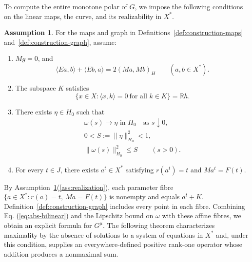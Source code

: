 \documentclass[11pt]{article}
\newcommand{\R}{\mathbb R}
\newcommand{\pair}[2]{\langle #1,#2\rangle}
\theoremstyle{definition}
\newtheorem{assumption}{Assumption}
\theoremstyle{remark}
\begin{document}
To compute the entire monotone polar of $G$, we impose the following conditions on the linear maps, the curve, and its realizability in $X^*$.
\begin{assumption}\label{ass:construction}
For the maps and graph in Definitions~\ref{def:construction-maps} and~\ref{def:construction-graph}, assume:
\begin{enumerate}
\renewcommand{\theenumi}{H\arabic{enumi}}
\renewcommand{\labelenumi}{(\theenumi)}
\item\label{ass:bilinear} $Mg=0$, and
\begin{equation}
\pair{Ea}{b}+\pair{Eb}{a}=2(Ma,Mb)_H
\qquad(a,b\in X^*).
\label{eq:abs-bilinear}
\end{equation}

\item\label{ass:annihilator} The subspace $K$ satisfies
\begin{equation}
\{x\in X:\pair{x}{k}=0\ \text{for all }k\in K\}=\R h.
\label{eq:abs-annihilator}
\end{equation}

\item\label{ass:curve-limit} There exists $\eta\in H_0$ such that
\begin{equation}
\begin{gathered}
\omega(s)\longrightarrow\eta\text{ in }H_0
\quad\text{as }s\downarrow0,\\
0<S:=\|\eta\|_{H_0}^2<1,\\
\|\omega(s)\|_{H_0}^2\le S\qquad(s>0).
\end{gathered}
\label{eq:abs-tail}
\end{equation}

\item\label{ass:realization} For every $t\in J$, there exists $a^t\in X^*$
satisfying $r(a^t)=t$ and $Ma^t=F(t)$.
\end{enumerate}
\end{assumption}
By Assumption~\ref{ass:construction}\textup{(\ref{ass:realization})}, each parameter fibre $\{a\in X^*:r(a)=t,\ Ma=F(t)\}$ is nonempty and equals $a^t+K$. Definition~\ref{def:construction-graph} includes every point in each fibre. Combining Eq. (\ref{eq:abs-bilinear}) and the Lipschitz bound on $\omega$ with these affine fibres, we obtain an explicit formula for $G^\mu$. The following theorem characterizes maximality by the absence of solutions to a system of equations in $X^*$ and, under this condition, supplies an everywhere-defined positive rank-one operator whose addition produces a nonmaximal sum.
\end{document}
